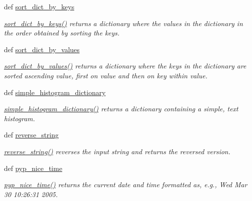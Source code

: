 \begin{CompactItemize}
def \hyperlink{namespacePyPedal_1_1pyp__utils_63d2062b3cf5023742e3cd85e87f7234}{sort\_\-dict\_\-by\_\-keys}
\begin{CompactList}\small\item\em \hyperlink{namespacePyPedal_1_1pyp__utils_63d2062b3cf5023742e3cd85e87f7234}{sort\_\-dict\_\-by\_\-keys()} returns a dictionary where the values in the dictionary in the order obtained by sorting the keys. \item\end{CompactList}\item 
def \hyperlink{namespacePyPedal_1_1pyp__utils_b306c118d7e74b6e8b7870cb6c02aaa6}{sort\_\-dict\_\-by\_\-values}
\begin{CompactList}\small\item\em \hyperlink{namespacePyPedal_1_1pyp__utils_b306c118d7e74b6e8b7870cb6c02aaa6}{sort\_\-dict\_\-by\_\-values()} returns a dictionary where the keys in the dictionary are sorted ascending value, first on value and then on key within value. \item\end{CompactList}\item 
def \hyperlink{namespacePyPedal_1_1pyp__utils_05fa91a1849789836163518b5089150a}{simple\_\-histogram\_\-dictionary}
\begin{CompactList}\small\item\em \hyperlink{namespacePyPedal_1_1pyp__utils_05fa91a1849789836163518b5089150a}{simple\_\-histogram\_\-dictionary()} returns a dictionary containing a simple, text histogram. \item\end{CompactList}\item 
def \hyperlink{namespacePyPedal_1_1pyp__utils_60fec41ca3239178d96e99295fa5a9a4}{reverse\_\-string}
\begin{CompactList}\small\item\em \hyperlink{namespacePyPedal_1_1pyp__utils_60fec41ca3239178d96e99295fa5a9a4}{reverse\_\-string()} reverses the input string and returns the reversed version. \item\end{CompactList}\item 
def \hyperlink{namespacePyPedal_1_1pyp__utils_d0f48a5eff86a5ec95476497b9e133ef}{pyp\_\-nice\_\-time}
\begin{CompactList}\small\item\em \hyperlink{namespacePyPedal_1_1pyp__utils_d0f48a5eff86a5ec95476497b9e133ef}{pyp\_\-nice\_\-time()} returns the current date and time formatted as, e.g., Wed Mar 30 10:26:31 2005. \item\end{CompactList}\item 

\end{CompactItemize}
